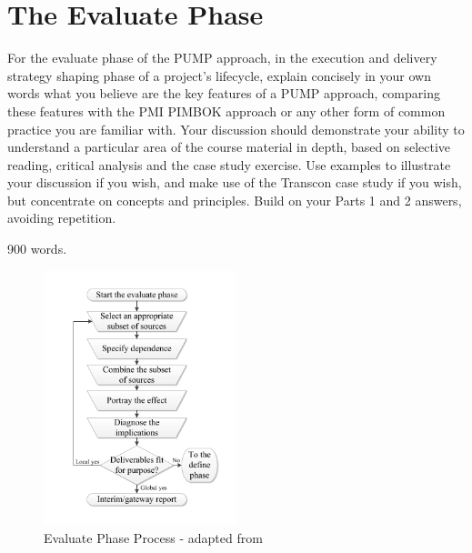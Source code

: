 \section{The Evaluate Phase} \label{s:Evaluate}

For the evaluate phase of the PUMP approach, in the execution and delivery strategy shaping phase of a project’s lifecycle, explain concisely in your own words what you believe are the key features of a PUMP approach, comparing these features with the PMI PIMBOK approach or any other form of common practice you are familiar with. Your discussion should demonstrate your ability to understand a particular area of the course material in depth, based on selective reading, critical analysis and the case study exercise. Use examples to illustrate your discussion if you wish, and make use of the Transcon case study if you wish, but concentrate on concepts and principles. Build on your Parts 1 and 2 answers, avoiding repetition.

900 words.

\begin{figure}[!h]
  \centering
    \includegraphics[width = 0.5\textwidth]{./Figures/Evaluate.pdf} 
\caption{Evaluate Phase Process - adapted from \cite{chapman}}
\label{Figure:Evaluate}
\end{figure}